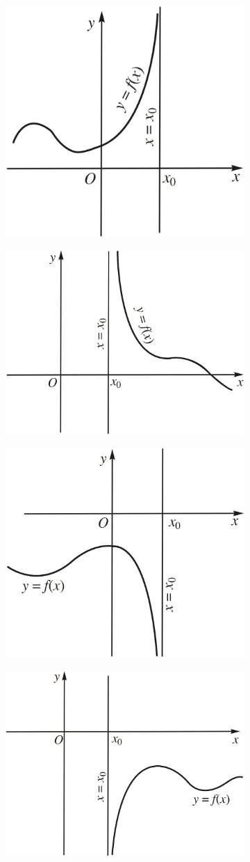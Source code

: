 \documentclass[oneside]{book}
\numberwithin{equation}{section}
\begin{document}
\begin{figure}[H]
	\centering
	\begin{subfigure}{.5\textwidth}
		\centering
		\includegraphics[width=.5\linewidth]{tiem_can_dung_a}
		\caption{}
	\end{subfigure}%
	\begin{subfigure}{.5\textwidth}
		\centering
		\includegraphics[width=.5\linewidth]{tiem_can_dung_b}
		\caption{}
	\end{subfigure}
	\begin{subfigure}{.5\textwidth}
		\centering
		\includegraphics[width=.5\linewidth]{tiem_can_dung_c}
		\caption{}
	\end{subfigure}%
	\begin{subfigure}{.5\textwidth}
		\centering
		\includegraphics[width=.5\linewidth]{tiem_can_dung_d}

\end{subfigure}
\end{figure}
\end{document}
